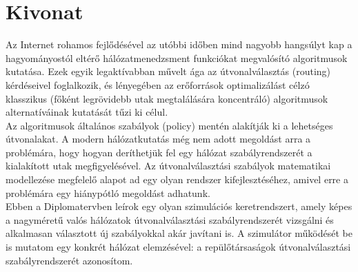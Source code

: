 \chapter*{Kivonat}

Az Internet rohamos fejlődésével az utóbbi időben mind nagyobb hangsúlyt kap a hagyományostól eltérő hálózatmenedzsment funkciókat megvalósító algoritmusok kutatása. Ezek egyik legaktívabban művelt ága az útvonalválasztás (routing) kérdéseivel foglalkozik, és lényegében az erőforrások optimalizálást célzó klasszikus (főként legrövidebb utak megtalálására koncentráló) algoritmusok alternatíváinak kutatását tűzi ki célul.\\

Az algoritmusok általános szabályok (policy) mentén alakítják ki a lehetséges útvonalakat. A modern hálózatkutatás még nem adott megoldást arra a problémára, hogy hogyan deríthetjük fel egy hálózat szabályrendszerét a kialakított utak megfigyelésével. Az útvonalválasztási szabályok matematikai modellezése megfelelő alapot ad \cite{Compact_Policy_Routing} egy olyan rendszer kifejlesztéséhez, amivel erre a problémára egy hiánypótló megoldást adhatunk.\\

Ebben a Diplomatervben leírok egy olyan szimulációs keretrendszert, amely képes a nagyméretű valós hálózatok útvonalválasztási szabályrendszerét vizsgálni és alkalmasan választott új szabályokkal akár javítani is. A szimulátor működését be is mutatom egy konkrét hálózat elemzésével: a repülőtársaságok útvonalválasztási szabályrendszerét azonosítom.

\vfill

\iffalse
\chapter*{Abstract}\addcontentsline{toc}{chapter}{Abstract}

This document is a \LaTeX-based skeleton for BSc/MSc~theses of students at the Electrical Engineering and Informatics Faculty, Budapest University of Technology and Economics. The usage of this skeleton is optional. It has been tested with the \emph{TeXLive} \TeX~implementation, and it requires the PDF-\LaTeX~compiler.
\vfill
\fi